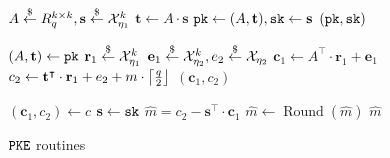 \documentclass{article}
\begin{document}
\begin{figure}[H]
    \begin{minipage}{0.3\textwidth}
        \begin{algorithm}[H]
            \caption{$\keygen_\pke$}\label{alg:kyber-pke-keygen}
            \begin{algorithmic}[1]
                \State $A \stackrel{\$}{\leftarrow} R_q^{k \times k}
                    , \mathbf{s} \stackrel{\$}{\leftarrow} \mathcal{X}_{\eta_1}^k$
                \State $\mathbf{t} \leftarrow A \cdot \mathbf{s}$
                \State $\texttt{pk} \leftarrow (A, \mathbf{t}), \texttt{sk} \leftarrow \mathbf{s}$
                \State \Return $(\texttt{pk}, \texttt{sk})$
            \end{algorithmic}
        \end{algorithm}
    \end{minipage}
    \hfill
    \begin{minipage}{0.3\textwidth}
        \begin{algorithm}[H]
            \caption{$\encrypt_\pke(\pk, m)$}\label{alg:kyber-pke-encrypt}
            \begin{algorithmic}[1]
                \State $(A, \mathbf{t}) \leftarrow \texttt{pk}$
                \State $\mathbf{r}_1 \stackrel{\$}{\leftarrow} \mathcal{X}_{\eta_1}^k$
                \State $\mathbf{e}_1 \stackrel{\$}{\leftarrow} \mathcal{X}_{\eta_2}^k,
                    e_2 \stackrel{\$}{\leftarrow} \mathcal{X}_{\eta_2}$
                \State $\mathbf{c}_1 \leftarrow A^\intercal \cdot \mathbf{r}_1 + \mathbf{e}_1$
                \State $c_2 \leftarrow \mathbf{t}^\intercal \cdot \mathbf{r}_1 + e_2 + m \cdot \left\lceil{\frac{q}{2}}\right\rfloor$
                \State \Return $(\mathbf{c}_1, c_2)$
            \end{algorithmic}
        \end{algorithm}
    \end{minipage}
    \hfill
    \begin{minipage}{0.3\textwidth}
        \begin{algorithm}[H]
            \caption{$\decrypt_\pke(\sk, c)$}\label{alg:kyber-pke-decrypt}
            \begin{algorithmic}[1]
                \State $(\mathbf{c}_1, c_2) \leftarrow c$
                \State $\mathbf{s} \leftarrow \texttt{sk}$
                \State $\hat{m} = c_2 - \mathbf{s}^\intercal \cdot \mathbf{c}_1$
                \State $\hat{m} \leftarrow \operatorname{Round}(\hat{m})$
                \State \Return $\hat{m}$
            \end{algorithmic}
        \end{algorithm}
    \end{minipage}
    \caption{$\texttt{PKE}$ routines}\label{fig:kyber-pke-routines}
\end{figure}
\end{document}

